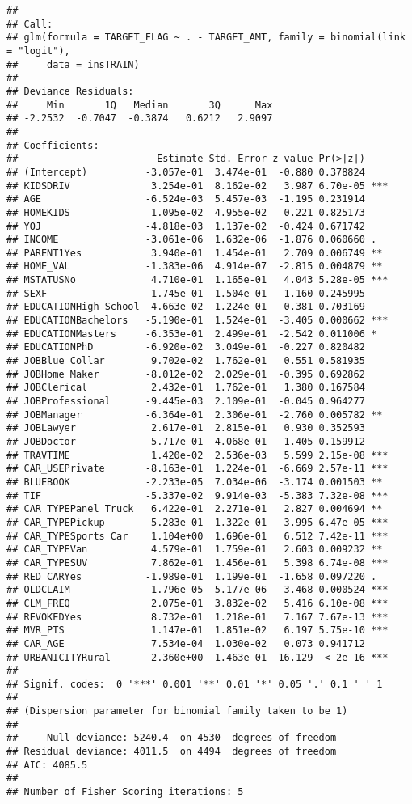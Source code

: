 \documentclass[]{article}
\begin{document}
\begin{verbatim}
## 
## Call:
## glm(formula = TARGET_FLAG ~ . - TARGET_AMT, family = binomial(link = "logit"), 
##     data = insTRAIN)
## 
## Deviance Residuals: 
##     Min       1Q   Median       3Q      Max  
## -2.2532  -0.7047  -0.3874   0.6212   2.9097  
## 
## Coefficients:
##                        Estimate Std. Error z value Pr(>|z|)    
## (Intercept)          -3.057e-01  3.474e-01  -0.880 0.378824    
## KIDSDRIV              3.254e-01  8.162e-02   3.987 6.70e-05 ***
## AGE                  -6.524e-03  5.457e-03  -1.195 0.231914    
## HOMEKIDS              1.095e-02  4.955e-02   0.221 0.825173    
## YOJ                  -4.818e-03  1.137e-02  -0.424 0.671742    
## INCOME               -3.061e-06  1.632e-06  -1.876 0.060660 .  
## PARENT1Yes            3.940e-01  1.454e-01   2.709 0.006749 ** 
## HOME_VAL             -1.383e-06  4.914e-07  -2.815 0.004879 ** 
## MSTATUSNo             4.710e-01  1.165e-01   4.043 5.28e-05 ***
## SEXF                 -1.745e-01  1.504e-01  -1.160 0.245995    
## EDUCATIONHigh School -4.663e-02  1.224e-01  -0.381 0.703169    
## EDUCATIONBachelors   -5.190e-01  1.524e-01  -3.405 0.000662 ***
## EDUCATIONMasters     -6.353e-01  2.499e-01  -2.542 0.011006 *  
## EDUCATIONPhD         -6.920e-02  3.049e-01  -0.227 0.820482    
## JOBBlue Collar        9.702e-02  1.762e-01   0.551 0.581935    
## JOBHome Maker        -8.012e-02  2.029e-01  -0.395 0.692862    
## JOBClerical           2.432e-01  1.762e-01   1.380 0.167584    
## JOBProfessional      -9.445e-03  2.109e-01  -0.045 0.964277    
## JOBManager           -6.364e-01  2.306e-01  -2.760 0.005782 ** 
## JOBLawyer             2.617e-01  2.815e-01   0.930 0.352593    
## JOBDoctor            -5.717e-01  4.068e-01  -1.405 0.159912    
## TRAVTIME              1.420e-02  2.536e-03   5.599 2.15e-08 ***
## CAR_USEPrivate       -8.163e-01  1.224e-01  -6.669 2.57e-11 ***
## BLUEBOOK             -2.233e-05  7.034e-06  -3.174 0.001503 ** 
## TIF                  -5.337e-02  9.914e-03  -5.383 7.32e-08 ***
## CAR_TYPEPanel Truck   6.422e-01  2.271e-01   2.827 0.004694 ** 
## CAR_TYPEPickup        5.283e-01  1.322e-01   3.995 6.47e-05 ***
## CAR_TYPESports Car    1.104e+00  1.696e-01   6.512 7.42e-11 ***
## CAR_TYPEVan           4.579e-01  1.759e-01   2.603 0.009232 ** 
## CAR_TYPESUV           7.862e-01  1.456e-01   5.398 6.74e-08 ***
## RED_CARYes           -1.989e-01  1.199e-01  -1.658 0.097220 .  
## OLDCLAIM             -1.796e-05  5.177e-06  -3.468 0.000524 ***
## CLM_FREQ              2.075e-01  3.832e-02   5.416 6.10e-08 ***
## REVOKEDYes            8.732e-01  1.218e-01   7.167 7.67e-13 ***
## MVR_PTS               1.147e-01  1.851e-02   6.197 5.75e-10 ***
## CAR_AGE               7.534e-04  1.030e-02   0.073 0.941712    
## URBANICITYRural      -2.360e+00  1.463e-01 -16.129  < 2e-16 ***
## ---
## Signif. codes:  0 '***' 0.001 '**' 0.01 '*' 0.05 '.' 0.1 ' ' 1
## 
## (Dispersion parameter for binomial family taken to be 1)
## 
##     Null deviance: 5240.4  on 4530  degrees of freedom
## Residual deviance: 4011.5  on 4494  degrees of freedom
## AIC: 4085.5
## 
## Number of Fisher Scoring iterations: 5
\end{verbatim}
\end{document}

